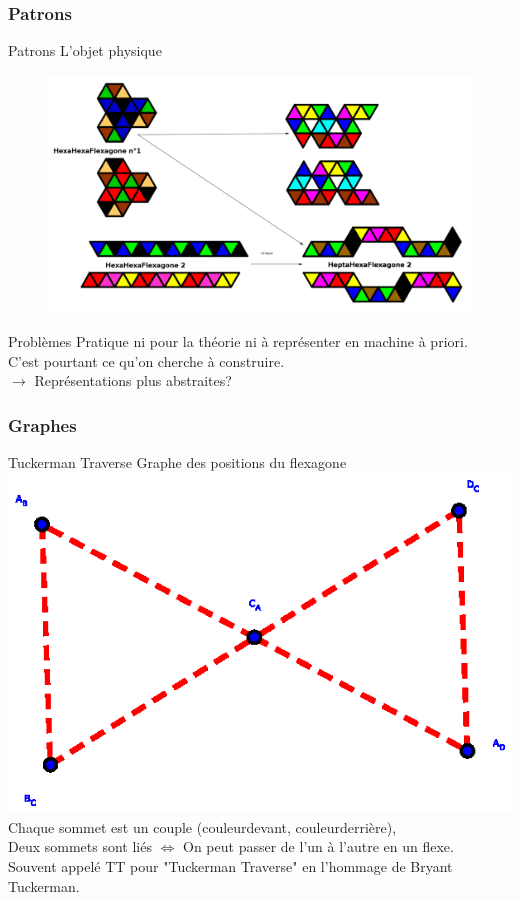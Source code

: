 \documentclass[french,xcolor=dvipsnames]{beamer}
\begin{document}
		\subsubsection{Patrons}
		\begin{frame}{Patrons}
			L'objet physique
			\begin{figure}
				\includegraphics[scale=0.19]{exemples_patrons.png}
			\end{figure}
		\end{frame}
		
		\begin{frame}{Problèmes}
			Pratique ni pour la théorie ni à représenter en machine à priori.\\
			C'est pourtant ce qu'on cherche à construire.\\
			$\longrightarrow$ Représentations plus abstraites?
		\end{frame}
				
		\subsubsection{Graphes}
		\begin{frame}{Tuckerman Traverse}
			Graphe des positions du flexagone
			\includegraphics[scale=0.6]{TT_graphe_4.eps}\\
			Chaque sommet est un couple (couleurdevant, couleurderrière),\\
			Deux sommets sont liés $\Leftrightarrow$ On peut passer de l'un à l'autre en un flexe.\\
			Souvent appelé TT pour "Tuckerman Traverse" en l'hommage de Bryant Tuckerman.
		\end{frame}		
		
\end{document}
